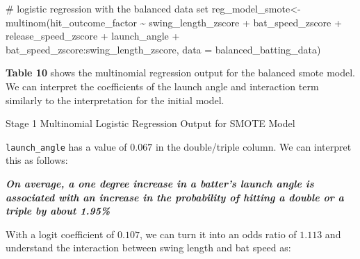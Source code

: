 \documentclass[
  letterpaper,
  DIV=11,
  numbers=noendperiod]{scrartcl}
\newenvironment{Shaded}{\begin{snugshade}}{\end{snugshade}}
\newcommand{\AttributeTok}[1]{\textcolor[rgb]{0.40,0.45,0.13}{#1}}
\newcommand{\CommentTok}[1]{\textcolor[rgb]{0.37,0.37,0.37}{#1}}
\newcommand{\FunctionTok}[1]{\textcolor[rgb]{0.28,0.35,0.67}{#1}}
\newcommand{\NormalTok}[1]{\textcolor[rgb]{0.00,0.23,0.31}{#1}}
\newcommand{\OtherTok}[1]{\textcolor[rgb]{0.00,0.23,0.31}{#1}}
\newcommand{\SpecialCharTok}[1]{\textcolor[rgb]{0.37,0.37,0.37}{#1}}
\begin{document}
\begin{Shaded}
\begin{Highlighting}[]
\CommentTok{\# logistic regression with the balanced data set }
\NormalTok{reg\_model\_smote}\OtherTok{\textless{}{-}} \FunctionTok{multinom}\NormalTok{(hit\_outcome\_factor }\SpecialCharTok{\textasciitilde{}}
\NormalTok{                          swing\_length\_zscore }\SpecialCharTok{+}
\NormalTok{                          bat\_speed\_zscore }\SpecialCharTok{+}
\NormalTok{                          release\_speed\_zscore }\SpecialCharTok{+}
\NormalTok{                          launch\_angle }\SpecialCharTok{+}
\NormalTok{                          bat\_speed\_zscore}\SpecialCharTok{:}\NormalTok{swing\_length\_zscore,}
                        \AttributeTok{data =}\NormalTok{ balanced\_batting\_data)}
\end{Highlighting}
\end{Shaded}

\textbf{Table 10} shows the multinomial regression output for the
balanced smote model. We can interpret the coefficients of the launch
angle and interaction term similarly to the interpretation for the
initial model.

\begin{table}

\caption{\label{tbl-10}Stage 1 Multinomial Logistic Regression Output
for SMOTE Model}


\end{table}%

\texttt{launch\_angle} has a value of \(0.067\) in the double/triple
column. We can interpret this as follows:

\textbf{\emph{On average, a one degree increase in a batter's launch
angle is associated with an increase in the probability of hitting a
double or a triple by about 1.95\%}}

With a logit coefficient of \(0.107\), we can turn it into an odds ratio
of \(1.113\) and understand the interaction between swing length and bat
speed as:
\end{document}

